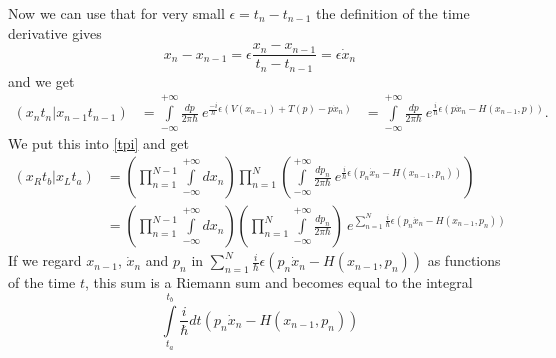 Now we can use that for very small $\epsilon = t_n - t_{n-1}$ the definition of the time derivative gives
\begin{equation}\label{deriv}
  x_{n} - x_{n-1} = \epsilon \frac{x_{n} -x_{n-1}}{t_n - t_{n-1}} =  \epsilon \dot{x}_n
\end{equation}
and we get
\begin{align}
   (x_n t_n | x_{n-1} t_{n-1})  &=  \int\limits_{-\infty}^{+\infty} \frac{dp}{2 \pi \hbar}  \ e^{\frac{-i}{\hbar} \epsilon ( V(x_{n-1}) + T(p) - p \dot{x}_n)}
                                &=  \int\limits_{-\infty}^{+\infty} \frac{dp}{2 \pi \hbar}  \ e^{\frac{i}{\hbar} \epsilon (p \dot{x}_n - H(x_{n-1},p))}.
\end{align}
We put this into \ref{tpi} and get 
\begin{align}
  (x_R t_b | x_L t_a) &=  (\prod_{n=1}^{N-1} \int\limits_{-\infty}^{+\infty} dx_{n})\prod_{n=1}^{N} (\int\limits_{-\infty}^{+\infty} \frac{dp_n}{2 \pi \hbar}  \ e^{\frac{i}{\hbar} \epsilon (p_n \dot{x}_n - H(x_{n-1},p_n))})  \\
                      &=  (\prod_{n=1}^{N-1} \int\limits_{-\infty}^{+\infty} dx_{n})(\prod_{n=1}^{N} \int\limits_{-\infty}^{+\infty}  \frac{dp_n}{2 \pi \hbar}) \ e^{\sum_{n=1}^{N}\frac{i}{\hbar} \epsilon (p_n \dot{x}_n - H(x_{n-1},p_n))}
\end{align}
If we regard $x_{n-1}$, $\dot{x}_n$ and $p_n$ in $\sum_{n=1}^{N}\frac{i}{\hbar} \epsilon (p_n \dot{x}_n - H(x_{n-1},p_n))$ as functions of the time $t$, this sum is a Riemann sum and becomes equal to the integral
\begin{equation}
  \int\limits_{t_a}^{t_b}  \frac{i}{\hbar} dt (p_n \dot{x}_n - H(x_{n-1},p_n))
\end{equation}
